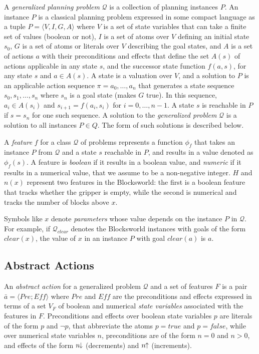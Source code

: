 \documentclass[letterpaper]{article} %
\newcommand{\tup}[1]{\langle #1 \rangle}
\newcommand{\Q}{\mathcal{Q}}
\newcommand{\Eff}{{\mathit{Eff}}}
\newcommand{\abst}[2]{\tup{#1;#2}}
\newcommand{\pplus}{\hspace{-.05em}\raisebox{.15ex}{\footnotesize$\uparrow$}}
\newcommand{\mminus}{\hspace{-.05em}\raisebox{.15ex}{\footnotesize$\downarrow$}}
\begin{document}
A \emph{generalized planning problem} $\Q$ is a collection of planning instances $P$.
An instance $P$ is a  classical planning problem expressed in some compact language
as a tuple $P=\tup{V,I,G,A}$ where $V$ is a set of state variables that can take a
finite set of values (boolean or not), $I$ is a set of atoms over $V$ defining an
initial state $s_0$, $G$ is a set of atoms or literals over $V$ describing the goal
states, and $A$ is a set of actions $a$ with their preconditions and effects that
define the set $A(s)$ of actions applicable in any state $s$, and the successor
state function $f(a,s)$, for any state $s$ and $a \in A(s)$.
A state is a valuation over $V$, and a solution to $P$ is an applicable action
sequence $\pi=a_0,\ldots,a_n$ that generates  a state sequence $s_0,s_1,\ldots,s_{n}$
where $s_n$ is a goal state (makes $G$ true). In this sequence, $a_i \in A(s_i)$
and $s_{i+1}=f(a_i,s_i)$ for $i=0, \ldots, n-1$. A state $s$ is reachable in $P$
if $s=s_n$ for one such sequence. A solution to the \emph{generalized problem}
$\Q$ is a solution to all instances $P \in Q$. The form of such solutions is
described below.

A \emph{feature} $f$ for a class $\Q$ of problems represents a function $\phi_f$
that takes an instance $P$ from $\Q$ and a state $s$ reachable in $P$, and results
in a value denoted as $\phi_f(s)$. 
A feature is \emph{boolean} if it results in a boolean value, and \emph{numeric}
if it results in a numerical value, that we assume to be a non-negative integer.
$H$ and $n(x)$ represent two features in the Blocksworld:
the first is a boolean feature that tracks whether the gripper is empty, while
the second is numerical and tracks the number of blocks above $x$. 

Symbols like $x$ denote \emph{parameters} whose value depends on the
instance $P$ in $\Q$. For example, if $\Q_{clear}$ denotes the Blocksworld
instances with goals of the form $clear(x)$, the value of $x$ in an instance
$P$ with goal $clear(a)$ is $a$.


\subsection{Abstract Actions}

An \emph{abstract action}  for a generalized problem $\Q$ and a set of features $F$
is a pair $\bar{a}=\abst{Pre}{\Eff}$ where $Pre$ and $\Eff$ are the  preconditions
and effects expressed in terms of a  set $V_F$ of boolean and numerical \emph{state variables}
associated with the features in $F$. Preconditions and effects over boolean state variables $p$ are literals of the form $p$
and $\neg p$, that abbreviate the  atoms $p=true$ and $p=false$, while  over  numerical state variables $n$,
preconditions are of  the form $n=0$ and $n > 0$, and effects  of the form $n\mminus$ (decrements) and
$n\pplus$ (increments).
\end{document}

